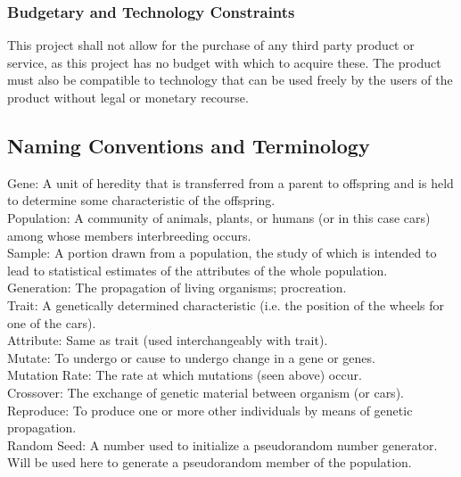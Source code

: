 \documentclass[12pt, titlepage]{article}
\begin{document}
\subsubsection{Budgetary and Technology Constraints}
This project shall not allow for the purchase of any third party product or 
service, as this project has no budget with which to acquire these. The product 
must also be compatible to technology that can be used freely by the users of 
the product without legal or monetary recourse.

\subsection{Naming Conventions and Terminology}

Gene: A unit of heredity that is transferred from a parent to offspring and is 
held to determine some characteristic of the offspring.\\

Population: A community of animals, plants, or humans (or in this case cars) 
among whose members interbreeding occurs.\\

Sample: A portion drawn from a population, the study of which is intended to 
lead to statistical estimates of the attributes of the whole population.\\

Generation: The propagation of living organisms; procreation.\\

Trait: A genetically determined characteristic (i.e. the position of the wheels 
for one of the cars).\\

Attribute: Same as trait (used interchangeably with trait).\\

Mutate: To undergo or cause to undergo change in a gene or genes.\\

Mutation Rate: The rate at which mutations (seen above) occur.\\

Crossover: The exchange of genetic material between organism (or cars).\\

Reproduce: To produce one or more other individuals by means of genetic 
propagation.\\

Random Seed: A number used to initialize a pseudorandom number generator. Will be used here to generate a pseudorandom member of the population.\\
\end{document}
